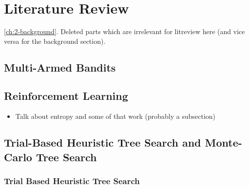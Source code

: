 

\chapter{\label{ch:3-litreview}Literature Review}

    \minitoc

     \ref{ch:2-background}. Deleted parts which are irrelevant for litreview here (and vice versa for the background section).


    \section{Multi-Armed Bandits}
    \label{sec:3-0-mab}
    

\section{Reinforcement Learning}
\label{sec:3-1-rl}

    \begin{itemize}
        \item Talk about entropy and some of that work (probably a subsection)
    \end{itemize}

\section{Trial-Based Heuristic Tree Search and Monte-Carlo Tree Search}
\label{sec:3-2-thts}

    \subsection{Trial Based Heuristic Tree Search}
    \label{sec:3-2-1-thts}

